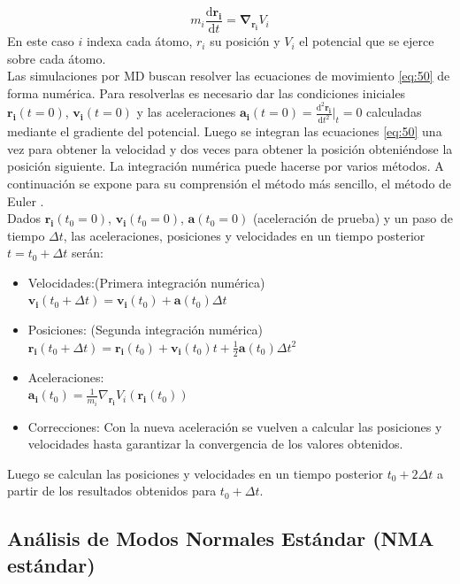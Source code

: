 \begin{equation}\label{eq:50}
m_i\frac{\mathrm{d}\mathbf{r_i}}{\mathrm{d}t}=\mathbf{\nabla}_\mathbf{r_i} V_i
\end{equation}
En este caso $i$ indexa cada \'{a}tomo, $r_i$ su posici\'{o}n y $V_i$ el potencial que se ejerce sobre cada \'{a}tomo.\\

Las simulaciones por MD buscan resolver las ecuaciones de movimiento \eqref{eq:50} de forma num\'{e}rica. Para resolverlas es necesario dar las condiciones iniciales $\mathbf{r_i}(t=0)$, $\mathbf{v_i}(t=0)$ y las aceleraciones $\mathbf{a_i}(t=0)=\frac{\mathrm{d}^2\mathbf{r_i}}{\mathrm{d}t^2}\bigg|_t=0$ calculadas mediante el gradiente del potencial. Luego se integran las ecuaciones \ref{eq:50} una vez para obtener la velocidad y dos veces para obtener la posici\'{o}n obteni\'{e}ndose la posici\'{o}n siguiente. La integraci\'{o}n num\'{e}rica puede hacerse por varios m\'{e}todos. A continuaci\'{o}n se expone para su comprensi\'{o}n el m\'{e}todo m\'{a}s sencillo, el m\'{e}todo de Euler \cite{Stote1999TheorySimulations}.\\

Dados $\mathbf{r_i}(t_0=0)$, $\mathbf{v_i}(t_0=0)$, $\mathbf{a}(t_0=0)$ (aceleraci\'{o}n de prueba) y un paso de tiempo $\Delta t$, las aceleraciones, posiciones y velocidades en un tiempo posterior $t=t_0+\Delta t$ ser\'{a}n:
\begin{itemize}
\item Velocidades:(Primera integraci\'{o}n num\'{e}rica)\\ $\mathbf{v_i}(t_0+\Delta t)=\mathbf{v_i}(t_0)+\mathbf{a}(t_0)\Delta t$
\item Posiciones: (Segunda integraci\'{o}n num\'{e}rica)\\ $\mathbf{r_i}(t_0+\Delta t)=\mathbf{r_i}(t_0)+\mathbf{v_i}(t_0)t+\frac{1}{2}\mathbf{a}(t_0)\Delta t^2$
\item Aceleraciones:\\ $\mathbf{a_i}(t_0)=\frac{1}{m_i}\nabla_\mathbf{r_i} V_i(\mathbf{r_i}(t_0))$
\item Correcciones: Con la nueva aceleraci\'{o}n se vuelven a calcular las posiciones y velocidades hasta garantizar la convergencia de los valores obtenidos.
\end{itemize}
Luego se calculan las posiciones y velocidades en un tiempo posterior $t_0+2\Delta t$ a partir de los resultados obtenidos para $t_0+\Delta t$.
\subsection{An\'{a}lisis de Modos Normales Est\'{a}ndar (NMA est\'{a}ndar)}\label{NMAsta}


